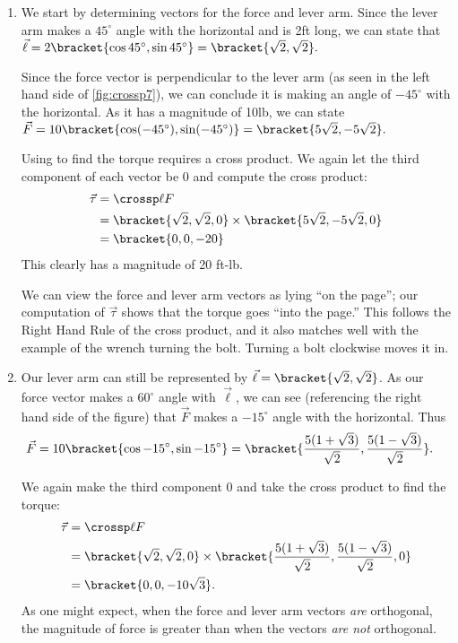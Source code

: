 {\begin{enumerate}
	\item We start by determining vectors for the force and lever arm. Since the lever arm makes a $45^\circ$ angle with the horizontal and is 2ft long, we can state that $\vec \ell = 2\bracket{\cos 45^\circ,\sin 45^\circ}= \bracket{\sqrt2,\sqrt2}.$
	
	Since the force vector is perpendicular to the lever arm (as seen in the left hand side of \autoref{fig:crossp7}), we can conclude it is making an angle of $-45^\circ$ with the horizontal. As it has a magnitude of 10lb, we can state $\vec F = 10\bracket{\cos (-45^\circ), \sin(-45^\circ)}= \bracket{5\sqrt2,-5\sqrt2}.$
	
	Using  to find the torque requires a cross product. We again let the third component of each vector be 0  and compute the cross product:
	\begin{align*}
	\vec\tau &= \crossp \ell F \\
				&= \bracket{\sqrt2,\sqrt2,0}\times \bracket{5\sqrt2,-5\sqrt2,0}\\
				&= \bracket{0,0,-20}
	\end{align*}
	This clearly has a magnitude of 20 ft-lb.
		
	We can view the force and lever arm vectors as lying ``on the page''; our computation of $\vec\tau$ shows that the torque goes ``into the page.'' This follows the Right Hand Rule of the cross product, and it also matches well with the example of the wrench turning the bolt. Turning a bolt clockwise moves it in.
	
	\item		Our lever arm can still be represented by $\vec \ell = \bracket{\sqrt2,\sqrt2}$. As our force vector makes a $60^\circ$ angle with $\vec \ell$, we can see (referencing the right hand side of the figure) that $\vec F$ makes a $-15^\circ$ angle with the horizontal. Thus 
	\begin{align*}
	\vec F = 10\bracket{\cos-15^\circ,\sin-15^\circ}&= \bracket{\frac{5(1+\sqrt3)}{\sqrt2},\frac{5(1-\sqrt3)}{\sqrt2}}
	.\end{align*}
	
	We again make the third component 0 and take the cross product to find the torque:
	\begin{align*}
	\vec\tau &= \crossp \ell F\\
	&= \bracket{\sqrt2,\sqrt2,0}\times  \bracket{\frac{5(1+\sqrt3)}{\sqrt2},\frac{5(1-\sqrt3)}{\sqrt2},0}\\
	&= \bracket{0,0,-10\sqrt3}
	.
	\end{align*}
	As one might expect, when the force and lever arm vectors \textit{are} orthogonal, the magnitude of force is greater than when the vectors \textit{are not} orthogonal.\eoehere
\end{enumerate}}

